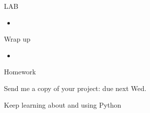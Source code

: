 \documentclass{beamer}
\begin{document}
\begin{frame}{LAB}

\begin{itemize}
  \item
\end{itemize}

\end{frame}

\begin{frame}{Wrap up}

\begin{itemize}
  \item
\end{itemize}

\end{frame}



\begin{frame}{Homework}

\vfill
{\Large Send me a copy of your project: due next Wed.}

\vfill
{\Large Keep learning about and using Python}
\vfill

\end{frame}
\end{document}
